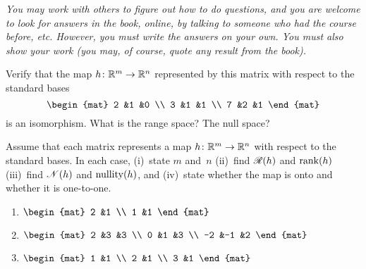 \documentclass[11pt,noanswers]{examjh}
\begin{document}

\vspace*{3ex}
\textit{You may work with others to figure out how to do questions, 
and you are welcome to look for answers in the book, online, by talking
to someone who had the course before, etc.
However, you must write 
the answers on your own.
You must also show your work (you may, of course, 
quote any result from the book).}

\begin{questions}
\question Verify that the map $\mbox{$h\colon \mathbb{R}^m\to \mathbb{R}^n$}$ represented by this matrix
  with respect to the standard bases
  \begin{equation*}
    \begin{mat}
      2  &1  &0  \\
      3  &1  &1  \\
      7  &2  &1
    \end{mat}
  \end{equation*}
  is an isomorphism.
  What is the range space?
  The null space?

\question
  Assume that each matrix represents a map $\mbox{$h\colon \mathbb{R}^m\to \mathbb{R}^n$}$
  with respect to the standard bases.
  In each case, 
  (i)~state $m$ and~$n$
  (ii)~find $\mathscr{R}(h)$ and $\operatorname{rank}(h)$
  (iii)~find $\mathscr{N}(h)$ and $\operatorname{nullity}(h)$,
  and (iv)~state whether the map is onto and whether it is one-to-one.
  \begin{enumerate}
  \item
    $
    \begin{mat}
      2  &1  \\ 
      1  &1
    \end{mat}
    $
  \item
    $
    \begin{mat}
      2  &3  &3  \\
      0  &1  &3  \\ 
     -2  &-1 &2 
    \end{mat}
    $
  \item
    $
    \begin{mat}
      1  &1  \\ 
      2  &1  \\
      3  &1
    \end{mat}
    $
  \end{enumerate}


\end{questions}
\end{document}
